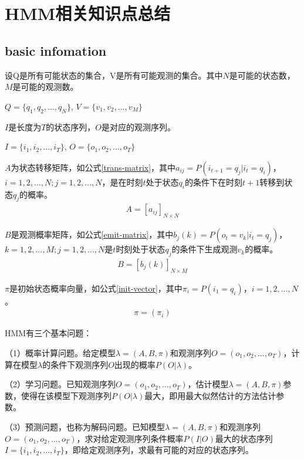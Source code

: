 \section{HMM相关知识点总结}
\subsection{basic infomation}
设Q是所有可能状态的集合，V是所有可能观测的集合。其中$N$是可能的状态数，$M$是可能的观测数。
\begin{center}
$Q=\{q_1, q_2, ..., q_N\}$, $V = \{v_1, v_2, ..., v_M\}$
\end{center}

$I$是长度为$T$的状态序列，$O$是对应的观测序列。
\begin{center}
$I=\{i_1, i_2, ..., i_T\}$, $O = \{o_1, o_2, ..., o_T\}$
\end{center}

$A$为状态转移矩阵，如公式\ref{trans-matrix}，其中$a_{ij}=P(i_{t+1}=q_j|i_t=q_i)$，$i=1,2,...,N; j=1,2,...,N$，是在时刻$t$处于状态$q_i$的条件下在时刻$t+1$转移到状态$q_j$的概率。
\begin{align}
\label{trans-matrix}
A=[a_{ij}]_{N\times{N}}
\end{align}

$B$是观测概率矩阵，如公式\ref{emit-matrix}，其中$b_j(k)=P(o_t=v_k|i_t=q_j)$，$k=1,2,...,M; j=1,2,...,N$是$t$时刻处于状态$q_j$的条件下生成观测$v_k$的概率。
\begin{align}
\label{emit-matrix}
B=[b_{j}(k)]_{N\times{M}}
\end{align}

$\pi$是初始状态概率向量，如公式\ref{init-vector}，其中$\pi_i=P(i_1=q_i)$，$i=1,2,...,N$。
\begin{align}
\label{init-vector}
\pi = (\pi_i)
\end{align}

HMM有三个基本问题：

（1）概率计算问题。给定模型$\lambda=(A,B,\pi)$和观测序列$O=(o_1, o_2, ..., o_T)$，计算在模型$\lambda$的条件下观测序列$O$出现的概率$P(O|\lambda)$。

（2）学习问题。已知观测序列$O=(o_1, o_2, ..., o_T)$，估计模型$\lambda=(A,B,\pi)$参数，使得在该模型下观测序列$P(O|\lambda)$最大，即用最大似然估计的方法估计参数。

（3）预测问题，也称为解码问题。已知模型$\lambda=(A,B,\pi)$和观测序列$O=(o_1, o_2, ..., o_T)$，求对给定观测序列条件概率$P(I|O)$最大的状态序列$I=\{i_1, i_2, ..., i_T\}$，即给定观测序列，求最有可能的对应的状态序列。

